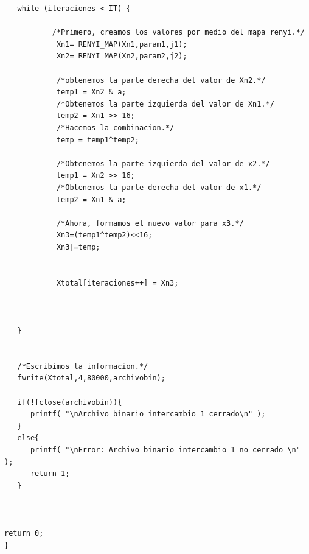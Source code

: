 \documentclass[10pt]{IEEEtran}
\begin{document}
\begin{verbatim}
   while (iteraciones < IT) {

           /*Primero, creamos los valores por medio del mapa renyi.*/
            Xn1= RENYI_MAP(Xn1,param1,j1);
            Xn2= RENYI_MAP(Xn2,param2,j2);

            /*obtenemos la parte derecha del valor de Xn2.*/
            temp1 = Xn2 & a;
            /*Obtenemos la parte izquierda del valor de Xn1.*/
            temp2 = Xn1 >> 16;
            /*Hacemos la combinacion.*/
            temp = temp1^temp2;

            /*Obtenemos la parte izquierda del valor de x2.*/
            temp1 = Xn2 >> 16;
            /*Obtenemos la parte derecha del valor de x1.*/
            temp2 = Xn1 & a;
            
            /*Ahora, formamos el nuevo valor para x3.*/
            Xn3=(temp1^temp2)<<16;
            Xn3|=temp;


            Xtotal[iteraciones++] = Xn3;
 
 

   } 
 

   /*Escribimos la informacion.*/
   fwrite(Xtotal,4,80000,archivobin); 

   if(!fclose(archivobin)){
      printf( "\nArchivo binario intercambio 1 cerrado\n" );
   }
   else{
      printf( "\nError: Archivo binario intercambio 1 no cerrado \n" );
      return 1;
   }  

  

return 0;
}
\end{verbatim}
\end{document}
